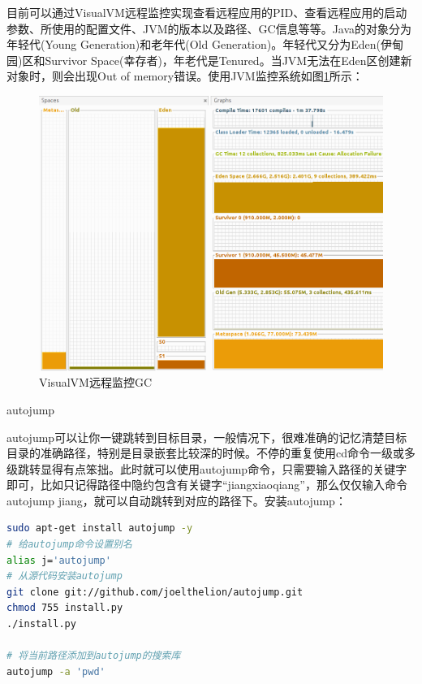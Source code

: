 \documentclass[12pt]{book}
\makeatletter
\numberwithin{dummy}{section}
\theoremstyle{ocrenumbox}
\theoremstyle{blacknumex}
\theoremstyle{blacknumbox}
\theoremstyle{ocrenum}
\renewcommand{\subsection}{\@startsection {subsection}{2}{\z@}
	{-3ex \@plus -0.1ex \@minus -.4ex}
	{0.5ex \@plus.2ex }
	{\normalfont\sffamily\bfseries}}
\makeatother
\begin{document}
目前可以通过VisualVM远程监控实现查看远程应用的PID、查看远程应用的启动参数、所使用的配置文件、JVM的版本以及路径、GC信息等等。Java的对象分为年轻代(Young Generation)和老年代(Old Generation)。年轻代又分为Eden(伊甸园)区和Survivor Space(幸存者)，年老代是Tenured。当JVM无法在Eden区创建新对象时，则会出现Out of memory错误。使用JVM监控系统如图\ref{fig:monitorsystemmemory}所示：


\begin{figure}[htbp]
	\centering
	\includegraphics[scale=0.3]{monitorsystemmemory.png}
	\caption{VisualVM远程监控GC}
	\label{fig:monitorsystemmemory}
\end{figure}


\subsection{autojump}

autojump可以让你一键跳转到目标目录，一般情况下，很难准确的记忆清楚目标目录的准确路径，特别是目录嵌套比较深的时候。不停的重复使用cd命令一级或多级跳转显得有点笨拙。此时就可以使用autojump命令，只需要输入路径的关键字即可，比如只记得路径中隐约包含有关键字“jiangxiaoqiang”，那么仅仅输入命令autojump jiang，就可以自动跳转到对应的路径下。安装autojump：

\begin{lstlisting}[language=Bash]
sudo apt-get install autojump -y
# 给autojump命令设置别名
alias j='autojump'
# 从源代码安装autojump
git clone git://github.com/joelthelion/autojump.git
chmod 755 install.py
./install.py

# 将当前路径添加到autojump的搜索库
autojump -a 'pwd'
\end{lstlisting}
\end{document}
